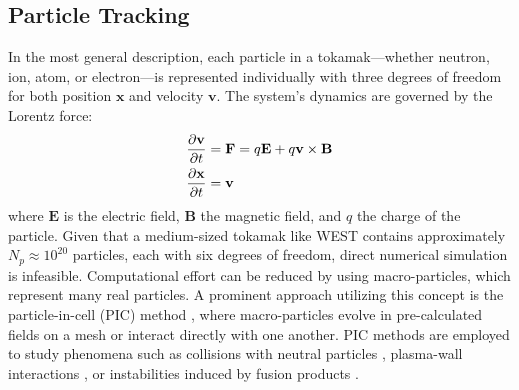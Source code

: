 \subsection{Particle Tracking}
\label{ssec:desc_particleTracking}
In the most general description, each particle in a tokamak—whether neutron, ion, atom, or electron—is represented individually with three degrees of freedom for both position $\mathbf{x}$ and velocity $\mathbf{v}$. The system's dynamics are governed by the Lorentz force:
\begin{align}
	\pdv{\mathbf{v}}{t} &= \mathbf{F} = q\mathbf{E} + q\mathbf{v} \times \mathbf{B} \label{eq:desc_particle}\\
	\pdv{\mathbf{x}}{t} &= \mathbf{v}
\end{align}
where $\mathbf{E}$ is the electric field, $\mathbf{B}$ the magnetic field, and $q$ the charge of the particle. \newline
Given that a medium-sized tokamak like WEST contains approximately $N_p \approx 10^{20}$ particles, each with six degrees of freedom, direct numerical simulation is infeasible. Computational effort can be reduced by using macro-particles, which represent many real particles. A prominent approach utilizing this concept is the particle-in-cell (PIC) method \cite{tskhakaya2007particle}, where macro-particles evolve in pre-calculated fields on a mesh or interact directly with one another. PIC methods are employed to study phenomena such as collisions with neutral particles \cite{birdsall1991particle}, plasma-wall interactions \cite{khaziev2018hpic}, or instabilities induced by fusion products \cite{cook2013particle}.



